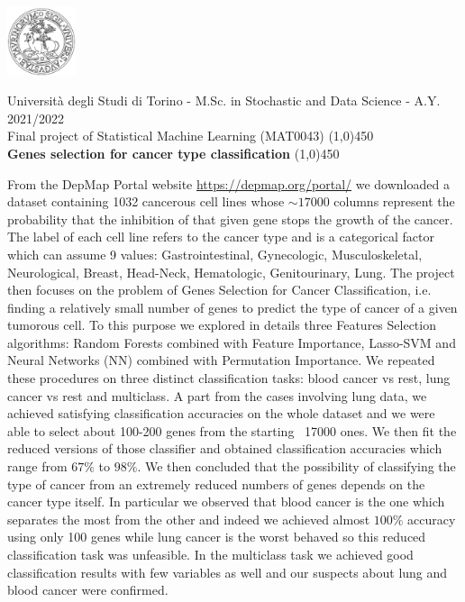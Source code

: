 \documentclass[a4paper,11pt, oneside]{article}  %
\begin{document}
\setcounter{secnumdepth}{2}
\pagestyle{plain} %

\centerline {\includegraphics[width=2cm]{logo.jpg}}
\begin{center}
Università degli Studi di Torino - M.Sc.  in Stochastic and Data Science - A.Y.  2021/2022 \\
\Large { Final project of Statistical Machine Learning (MAT0043)}
\line(1,0){450}\\ 
\vspace{0.4cm} 
{ \huge \textbf{Genes selection for cancer type classification} }
\vspace{0.1cm}
\line(1,0){450} \\
\end{center}

From the DepMap Portal website \url{https://depmap.org/portal/} we downloaded a dataset containing 1032 cancerous cell lines whose $\sim 17000$ columns represent the probability that the inhibition of that given gene stops the growth of the cancer.  The label of each cell line refers to the cancer type and is a categorical factor which can assume 9 values: Gastrointestinal,  Gynecologic,  Musculoskeletal,  Neurological,  Breast,  Head-Neck,  Hematologic,  Genitourinary,  Lung.  The project then focuses on the problem of Genes Selection for Cancer Classification,  i.e.  finding a relatively small number of genes to predict the type of cancer of a given tumorous cell.  To this purpose we explored in details three Features Selection algorithms: Random Forests combined with Feature Importance,  Lasso-SVM and Neural Networks (NN) combined with Permutation Importance.  We repeated these procedures on three distinct classification tasks: blood cancer vs rest,  lung cancer vs rest and multiclass.  A part from the cases involving lung data,  we achieved satisfying classification accuracies on the whole dataset and we were able to select about 100-200 genes from the starting ~17000 ones.  We then fit the reduced versions of those classifier and obtained classification accuracies which range from $67\%$ to $98\%$.  We then concluded that the possibility of classifying the type of cancer from an extremely reduced numbers of genes depends on the cancer type itself.  In particular we observed that blood cancer is the one which separates the most from the other and indeed we achieved almost $100\%$ accuracy using only 100 genes while lung cancer is the worst behaved so this reduced classification task was unfeasible.  In the multiclass task we achieved good classification results with few variables as well and our suspects about lung and blood cancer were confirmed.  
\end{document}
